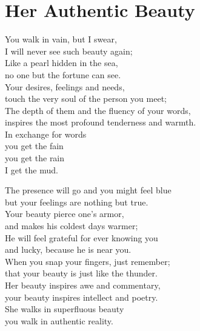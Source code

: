 \documentclass[14pt, a4paper]{memoir}
\begin{document}
\section*{\centering Her Authentic Beauty}\vspace{1cm}

You walk in vain, but I swear,\\
I will never see such beauty again;\\
Like a pearl hidden in the sea,\\
no one but the fortune can see.\\
Your desires, feelings and needs,\\
touch the very soul of the person you meet;\\
The depth of them and the fluency of your words,\\
inspires the most profound tenderness and warmth.\\
In exchange for words\\
you get the fain\\
you get the rain\\
I get the mud.\bigbreak

The presence will go and you might feel blue\\
but your feelings are nothing but true.\\
Your beauty pierce one's armor, \\
and makes his coldest days warmer;\\
He will feel grateful for ever knowing you\\
and lucky, because he is near you.\\ 
When you snap your fingers, just remember;\\
that your beauty is just like the thunder.\\
Her beauty inspires awe and commentary,\\
your beauty inspires intellect and poetry.\\
She walks in superfluous beauty\\
you walk in authentic reality.



  
\end{document}
